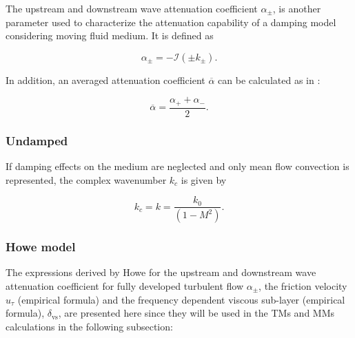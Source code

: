 \documentclass[12pt]{article}
\begin{document}
The upstream and downstream wave attenuation coefficient $\alpha_{\pm}$, is another parameter used to characterize the attenuation capability of a damping model considering moving fluid medium. It is defined as

\begin{equation}
	\alpha_{\pm} = - \mathcal{I}(\pm k_{\pm}).
\end{equation}

In addition, an averaged attenuation coefficient  $\overline{\alpha}$ can be calculated as in \cite{ronneberger_ahrens_1977, weng_paper3_2015}:

\begin{equation} \label{eq:mean_attenuation}
	\overline{\alpha} = \frac{\alpha_+ + \alpha_-}{2}.
\end{equation}

\subsubsection{Undamped}

If damping effects on the medium are neglected and only mean flow convection is represented, the complex wavenumber $k_c$ is given by 

\begin{equation}
k_c = k = \frac{k_0}{(1-M^2)}.
\end{equation}

\subsubsection{Howe model}

The expressions derived by Howe \cite{howe_1995} for the upstream and downstream wave attenuation coefficient for fully developed turbulent flow $\alpha_{\pm}$, the friction velocity $u_{\tau}$ (empirical formula) and the frequency dependent viscous sub-layer (empirical formula), $\delta_{\text{vs}}$, are presented here since they will be used in the \acrshort{TMs} and \acrshort{MMs} calculations in the following subsection:

\end{document}
